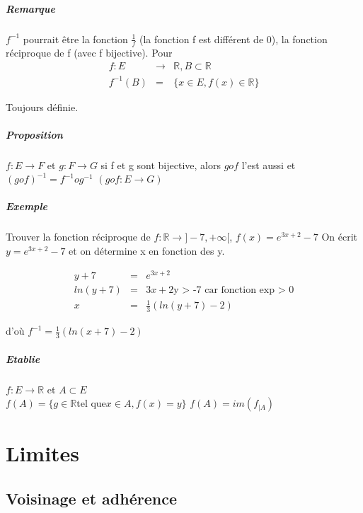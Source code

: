 \paragraph{Remarque} $f^{-1}$ pourrait être la fonction $\frac{1}{f}$ (la fonction f est différent de 0), la fonction réciproque de f (avec f bijective).
Pour
\begin{align*}
	f : E & \rightarrow & \mathbb{R}, B \subset \mathbb{R} \\
	f^{-1}(B) & = & \{x \in E, f(x) \in \mathbb{R}\}
\end{align*}

Toujours définie.

\paragraph{Proposition} $ f : E \rightarrow F$ et $g:F \rightarrow G$
si f et g sont bijective, alors $gof$ l'est aussi et $(gof)^{-1} = f^{-1}og^{-1}$ $(gof : E \rightarrow G)$

\paragraph{Exemple} Trouver la fonction réciproque de $f : \mathbb{R} \rightarrow ]-7, +\infty[ $, $f(x) = e^{3x+2} - 7$
On écrit $y = e^{3x+2}-7$ et on détermine x en fonction des y.

\begin{align*}
	y + 7 & = & e^{3x+2} \\
	ln(y+7) & = & 3x + 2  \text{y > -7 car fonction exp > 0}\\
	x &=& \frac{1}{3}(ln(y+7)-2)
\end{align*}

d'où $f^{-1} = \frac{1}{3}(ln(x+7)-2)$

\paragraph{Etablie} $f : E \rightarrow \mathbb{R}$ et $A \subset E$ ~\\
$f(A) = \{g \in \mathbb{R} \text{tel que} x \in A, f(x) = y\}$
$f(A) = im(f_{|A})$

\chapter{Limites}

\section{Voisinage et adhérence}

